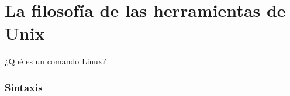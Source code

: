 

\section{La filosofía de las herramientas de Unix}

\begin{frame}[c]{¿Qué es un comando Linux?}
\end{frame}

\begin{frame}[fragile]
  \frametitle{Sintaxis}

  \vspace{\baselineskip}
\end{frame}
